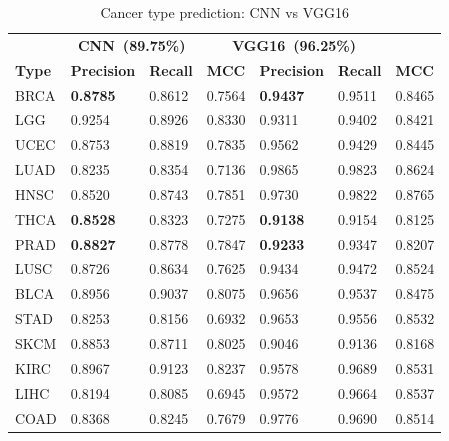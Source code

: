 \begin{table}[h]
    \caption{Cancer type prediction: CNN vs VGG16}
      \label{table:class_specific} %
        \begin{center}
        \vspace{-6mm}
        \scriptsize{
        \begin{tabular}{l|lll|lll}
        \toprule
        {} & \multicolumn{2}{c}{\textbf{\hspace{0.7cm} CNN~(89.75\%)}} & \multicolumn{3}{c}{ \textbf{\hspace{1.5cm} VGG16~(96.25\%)}} &  {} \\
        \textbf{Type } & \textbf{Precision} &  \textbf{Recall}  & \textbf{MCC} & \textbf{Precision} &  \textbf{Recall} & \textbf{MCC} \\\midrule%
        BRCA   & {\color{red}\textbf{0.8785}} & 0.8612 & 0.7564 & {\color{red}\textbf{0.9437}} & 0.9511 & 0.8465  \\%
        LGG    & 0.9254 & 0.8926 & 0.8330 & 0.9311 & 0.9402 & 0.8421  \\%
        UCEC   & 0.8753 & 0.8819 & 0.7835 & 0.9562 & 0.9429 & 0.8445  \\%
        LUAD   & 0.8235 & 0.8354 & 0.7136 & 0.9865 & 0.9823 & 0.8624  \\%
        HNSC   & 0.8520 & 0.8743 & 0.7851 & 0.9730 & 0.9822 & 0.8765  \\%
        THCA   & {\color{red}\textbf{0.8528}} & 0.8323 & 0.7275 & {\color{red}\textbf{0.9138}} & 0.9154 & 0.8125  \\%
        PRAD   & {\color{red}\textbf{0.8827}} & 0.8778 & 0.7847 & {\color{red}\textbf{0.9233}} & 0.9347 & 0.8207  \\%
        LUSC   & 0.8726 & 0.8634 & 0.7625 & 0.9434 & 0.9472 & 0.8524  \\%
        BLCA   & 0.8956 & 0.9037 & 0.8075 & 0.9656 & 0.9537 & 0.8475  \\%
        STAD   & 0.8253 & 0.8156 & 0.6932 & 0.9653 & 0.9556 & 0.8532  \\%
        SKCM   & 0.8853 & 0.8711 & 0.8025 & 0.9046 & 0.9136 & 0.8168  \\%
        KIRC   & 0.8967 & 0.9123 & 0.8237 & 0.9578 & 0.9689 & 0.8531  \\%
        LIHC   & 0.8194 & 0.8085 & 0.6945 & 0.9572 & 0.9664 & 0.8537  \\%
        COAD   & 0.8368 & 0.8245 & 0.7679 & 0.9776 & 0.9690 & 0.8514  \\%

\end{tabular}}
\end{center}
\end{table}
